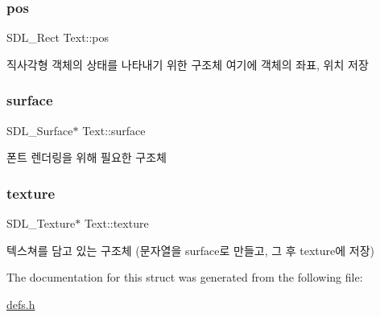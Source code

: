\subsubsection{\texorpdfstring{pos}{pos}}
{\footnotesize\ttfamily S\+D\+L\+\_\+\+Rect Text\+::pos}

직사각형 객체의 상태를 나타내기 위한 구조체 여기에 객체의 좌표, 위치 저장 \mbox{\label{struct_text_a881e261364e0678ddcf6865bf9d668b9}} 
\subsubsection{\texorpdfstring{surface}{surface}}
{\footnotesize\ttfamily S\+D\+L\+\_\+\+Surface$\ast$ Text\+::surface}

폰트 렌더링을 위해 필요한 구조체 \mbox{\label{struct_text_aea2a82ef1d8b4d448b6b3e524bce2cc2}} 
\subsubsection{\texorpdfstring{texture}{texture}}
{\footnotesize\ttfamily S\+D\+L\+\_\+\+Texture$\ast$ Text\+::texture}

텍스쳐를 담고 있는 구조체 (문자열을 surface로 만들고, 그 후 texture에 저장) 

The documentation for this struct was generated from the following file\+:\begin{DoxyCompactItemize}
\item 
\hyperlink{defs_8h}{defs.\+h}\end{DoxyCompactItemize}
